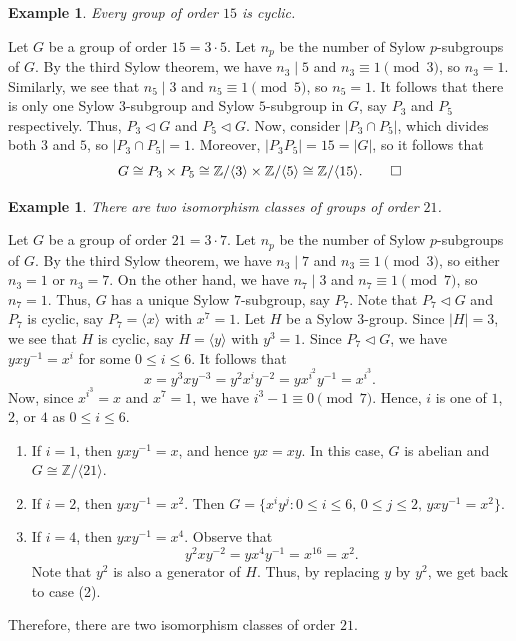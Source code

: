 \documentclass[10pt]{article}
\makeatletter
\newcommand{\Z}{\mathbb{Z}}
\newcommand{\norm}{\triangleleft}
\theoremstyle{newstyle}
\newtheorem{exmp}[thm]{Example}
\newenvironment{pf}[1][\proofname]{\par
  \pushQED{\qed}%
  \normalfont \topsep0\p@\relax
  \trivlist
  \item[\hskip\labelsep\scshape
  #1\@addpunct{.}]\ignorespaces
}{%
  \popQED\endtrivlist\@endpefalse
}
\makeatother
\begin{document}
\begin{exmp}
Every group of order $15$ is cyclic.
\end{exmp}
\begin{pf}
Let $G$ be a group of order $15 = 3 \cdot 5$. Let $n_p$ be the number of Sylow $p$-subgroups of $G$.
By the third Sylow theorem, we have $n_3 \mid 5$ and $n_3 \equiv 1 \pmod 3$, so $n_3 = 1$. 
Similarly, we see that $n_5 \mid 3$ and $n_5 \equiv 1 \pmod 5$, so $n_5 = 1$. It follows that 
there is only one Sylow $3$-subgroup and Sylow $5$-subgroup in $G$, say $P_3$ and $P_5$ respectively. 
Thus, $P_3 \norm G$ and $P_5 \norm G$. Now, consider $|P_3 \cap P_5|$, which divides both $3$ and $5$, 
so $|P_3 \cap P_5| = 1$. Moreover, $|P_3P_5| = 15 = |G|$, so it follows that 
\[ G \cong P_3 \times P_5 \cong \Z/\langle 3 \rangle \times \Z/\langle 5 \rangle \cong 
\Z/\langle 15 \rangle. \qedhere \]
\end{pf}

\begin{exmp}
There are two isomorphism classes of groups of order $21$. 
\end{exmp}
\begin{pf}
Let $G$ be a group of order $21 = 3 \cdot 7$. Let $n_p$ be the number of Sylow $p$-subgroups of $G$. 
By the third Sylow theorem, we have $n_3 \mid 7$ and $n_3 \equiv 1 \pmod 3$, so either 
$n_3 = 1$ or $n_3 = 7$. On the other hand, we have $n_7 \mid 3$ and $n_7 \equiv 1 \pmod 7$, 
so $n_7 = 1$. Thus, $G$ has a unique Sylow $7$-subgroup, say $P_7$. Note that $P_7 \norm G$ 
and $P_7$ is cyclic, say $P_7 = \langle x \rangle$ with $x^7 = 1$. Let $H$ be a 
Sylow $3$-group. Since $|H| = 3$, we see that $H$ is cyclic, say $H = \langle y \rangle$ 
with $y^3 = 1$. Since $P_7 \norm G$, we have $yxy^{-1} = x^i$ for some $0 \leq i \leq 6$. 
It follows that 
\[ x = y^3 x y^{-3} = y^2 x^i y^{-2} = yx^{i^2}y^{-1} = x^{i^3}. \]
Now, since $x^{i^3} = x$ and $x^7 = 1$, we have $i^3 - 1 \equiv 0 \pmod 7$. Hence, 
$i$ is one of $1$, $2$, or $4$ as $0 \leq i \leq 6$. 
\begin{enumerate}[(1)]
    \item If $i = 1$, then $yxy^{-1} = x$, and hence $yx = xy$. In this case, $G$ is abelian 
    and $G \cong \Z/\langle 21 \rangle$. 
    \item If $i = 2$, then $yxy^{-1} = x^2$. Then $G = \{x^i y^j : 0 \leq i \leq 6,\, 
    0 \leq j \leq 2,\, yxy^{-1} = x^2\}$. 
    \item If $i = 4$, then $yxy^{-1} = x^4$. Observe that 
    \[ y^2 xy^{-2} = yx^4 y^{-1} = x^{16} = x^2. \]
    Note that $y^2$ is also a generator of $H$. Thus, by replacing $y$ by $y^2$, we 
    get back to case (2). 
\end{enumerate}
Therefore, there are two isomorphism classes of order $21$. 
\end{pf}
\end{document}
